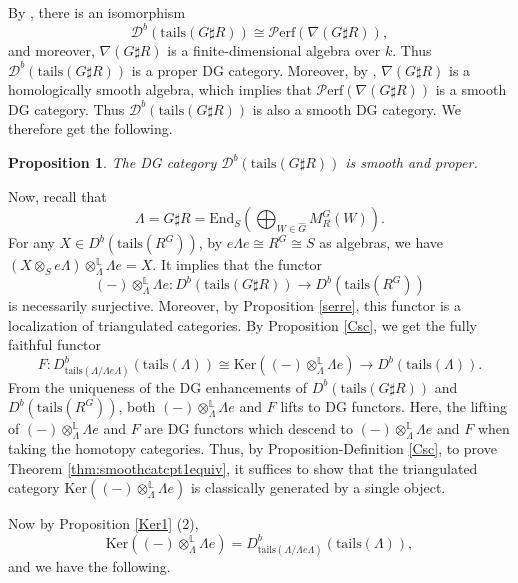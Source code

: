 \documentclass[11pt,reqno]{amsart}
\newtheorem{proposition}[theorem]{Proposition}
\theoremstyle{definition}
\begin{document}
By \cite[Theorem 4.14]{MM}, there is an isomorphism
$$
\mathcal{D}^{b}(\mathrm{tails}(G \sharp R)) \cong 
\mathcal{P}\mathrm{erf}(\nabla(G \sharp R)), 
$$
and moreover, 
$\nabla(G \sharp R)$ is a finite-dimensional algebra over $k$. Thus
$\mathcal{D}^{b}(\mathrm{tails}(G \sharp R))$ 
is a proper DG category. 
Moreover, by \cite[Proposition 7.5.1]{MR1}, $\nabla(G \sharp R)$ is a 
homologically smooth algebra, which implies that 
$\mathcal{P}\mathrm{erf}(\nabla(G \sharp R))$ 
is a smooth DG category. Thus
$\mathcal{D}^{b}(\mathrm{tails}(G \sharp R))$ is also a smooth DG category. 
We therefore get the following. 

\begin{proposition}\label{gfubjnv}
The DG category $\mathcal{D}^{b}(\mathrm{tails}(G \sharp R))$ is smooth and proper.
\end{proposition}

Now, recall that
$$
\Lambda = G \sharp R = \mathrm{End}_{S}( \bigoplus_{W \in \hat{G}} M^{G}_R(W) ). 
$$ 
For any $X \in D^{b}(\mathrm{tails}(R^G))$,  
by $e \Lambda e \cong R^G \cong S$ as algebras, 
we have
$(X \otimes_{S} e \Lambda ) \otimes^{\mathbb{L}}_{\Lambda} \Lambda e = X$.
It implies that the functor 
$$
(-) \otimes^{\mathbb{L}}_{\Lambda} \Lambda e : D^{b}(\mathrm{tails}(G \sharp R))
 \rightarrow D^{b}(\mathrm{tails}(R^G))
$$
is necessarily surjective. 
Moreover, by Proposition \ref{serre},  
this functor is a localization of triangulated categories. 
By Proposition \ref{Csc}, we get the fully faithful functor
$$
F:  D^{b}_{\mathrm{tails}(\Lambda/\Lambda e \Lambda)}(\mathrm{tails}
(\Lambda)) \cong \mathrm{Ker}( (-) \otimes^{\mathbb{L}}_{\Lambda} \Lambda e )  
\rightarrow D^{b}(\mathrm{tails}(\Lambda)). 
$$
From the uniqueness of the
DG enhancements of $D^{b}(\mathrm{tails}(G \sharp R))$ and 
$D^{b}(\mathrm{tails}(R^G))$, both $(-) \otimes^{\mathbb{L}}_{\Lambda} \Lambda e$ and $F$ 
lifts to DG functors. 
Here, the lifting of $(-) \otimes^{\mathbb{L}}_{\Lambda} \Lambda e$ and $F$ are 
DG functors which descend to
$(-) \otimes^{\mathbb{L}}_{\Lambda} \Lambda e$ and $F$ when taking 
the
homotopy categories.  
Thus, by Proposition-Definition \ref{Csc}, to prove 
Theorem \ref{thm:smoothcatcpt1equiv}, it suffices to show that
the triangulated category $\mathrm{Ker}( (-) \otimes^{\mathbb{L}}_{\Lambda} \Lambda e ) $ 
is classically  generated by a single object. 

Now by Proposition \ref{Ker1} (2), 
$$
\mathrm{Ker}( (-) \otimes^{\mathbb{L}}_{\Lambda} 
\Lambda e ) = D^{b}_{\mathrm{tails}(\Lambda/ \Lambda e \Lambda)}(\mathrm{tails}(\Lambda)),
$$
and we have the following.
\end{document}
